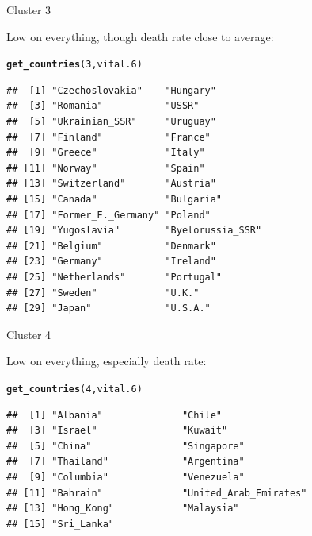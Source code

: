 \documentclass[unknownkeysallowed]{beamer}\usepackage[]{graphicx}\usepackage[]{color}
\makeatletter
\newcommand{\hlnum}[1]{\textcolor[rgb]{0.686,0.059,0.569}{#1}}%
\newcommand{\hlstd}[1]{\textcolor[rgb]{0.345,0.345,0.345}{#1}}%
\newcommand{\hlkwd}[1]{\textcolor[rgb]{0.737,0.353,0.396}{\textbf{#1}}}%
\newenvironment{kframe}{%
 \def\at@end@of@kframe{}%
 \ifinner\ifhmode%
  \def\at@end@of@kframe{\end{minipage}}%
  \begin{minipage}{\columnwidth}%
 \fi\fi%
 \def\FrameCommand##1{\hskip\@totalleftmargin \hskip-\fboxsep
 \colorbox{shadecolor}{##1}\hskip-\fboxsep
     \hskip-\linewidth \hskip-\@totalleftmargin \hskip\columnwidth}%
 \MakeFramed {\advance\hsize-\width
   \@totalleftmargin\z@ \linewidth\hsize
   \@setminipage}}%
 {\par\unskip\endMakeFramed%
 \at@end@of@kframe}
\newenvironment{knitrout}{}{} %
\makeatother
\begin{document}
\begin{frame}[fragile]{Cluster 3}

  Low on everything, though death rate close to average:

  
\begin{knitrout}\footnotesize
{}\color{fgcolor}\begin{kframe}
\begin{alltt}
\hlkwd{get_countries}\hlstd{(}\hlnum{3}\hlstd{,vital.6)}
\end{alltt}
\begin{verbatim}
##  [1] "Czechoslovakia"    "Hungary"          
##  [3] "Romania"           "USSR"             
##  [5] "Ukrainian_SSR"     "Uruguay"          
##  [7] "Finland"           "France"           
##  [9] "Greece"            "Italy"            
## [11] "Norway"            "Spain"            
## [13] "Switzerland"       "Austria"          
## [15] "Canada"            "Bulgaria"         
## [17] "Former_E._Germany" "Poland"           
## [19] "Yugoslavia"        "Byelorussia_SSR"  
## [21] "Belgium"           "Denmark"          
## [23] "Germany"           "Ireland"          
## [25] "Netherlands"       "Portugal"         
## [27] "Sweden"            "U.K."             
## [29] "Japan"             "U.S.A."
\end{verbatim}
\end{kframe}
\end{knitrout}
  
\end{frame}
\begin{frame}[fragile]{Cluster 4}

    Low on everything, especially death rate:

  
\begin{knitrout}\small
{}\color{fgcolor}\begin{kframe}
\begin{alltt}
\hlkwd{get_countries}\hlstd{(}\hlnum{4}\hlstd{,vital.6)}
\end{alltt}
\begin{verbatim}
##  [1] "Albania"              "Chile"               
##  [3] "Israel"               "Kuwait"              
##  [5] "China"                "Singapore"           
##  [7] "Thailand"             "Argentina"           
##  [9] "Columbia"             "Venezuela"           
## [11] "Bahrain"              "United_Arab_Emirates"
## [13] "Hong_Kong"            "Malaysia"            
## [15] "Sri_Lanka"
\end{verbatim}
\end{kframe}
\end{knitrout}
  
\end{frame}
\end{document}
